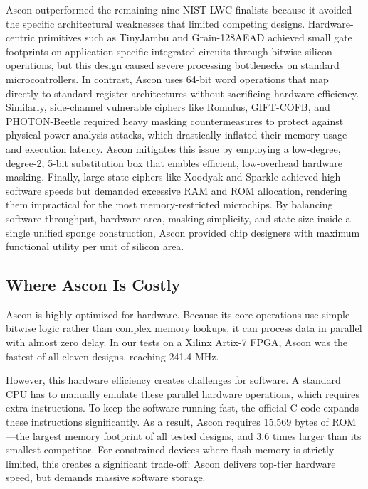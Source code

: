 Ascon outperformed the remaining nine NIST LWC finalists because it avoided the specific architectural weaknesses that limited competing designs. Hardware-centric primitives such as TinyJambu and Grain-128AEAD achieved small gate footprints on application-specific integrated circuits through bitwise silicon operations, but this design caused severe processing bottlenecks on standard microcontrollers. In contrast, Ascon uses 64-bit word operations that map directly to standard register architectures without sacrificing hardware efficiency. Similarly, side-channel vulnerable ciphers like Romulus, GIFT-COFB, and PHOTON-Beetle required heavy masking countermeasures to protect against physical power-analysis attacks, which drastically inflated their memory usage and execution latency. Ascon mitigates this issue by employing a low-degree, degree-2, 5-bit substitution box that enables efficient, low-overhead hardware masking. Finally, large-state ciphers like Xoodyak and Sparkle achieved high software speeds but demanded excessive RAM and ROM allocation, rendering them impractical for the most memory-restricted microchips. By balancing software throughput, hardware area, masking simplicity, and state size inside a single unified sponge construction, Ascon provided chip designers with maximum functional utility per unit of silicon area.


\subsection{Where Ascon Is Costly}

Ascon is highly optimized for hardware. Because its core operations use simple bitwise logic rather than complex memory lookups, it can process data in parallel with almost zero delay. In our tests on a Xilinx Artix-7 FPGA, Ascon was the fastest of all eleven designs, reaching 241.4 MHz.

However, this hardware efficiency creates challenges for software. A standard CPU has to manually emulate these parallel hardware operations, which requires extra instructions. To keep the software running fast, the official C code expands these instructions significantly. As a result, Ascon requires 15,569 bytes of ROM—the largest memory footprint of all tested designs, and 3.6 times larger than its smallest competitor. For constrained devices where flash memory is strictly limited, this creates a significant trade-off: Ascon delivers top-tier hardware speed, but demands massive software storage.

